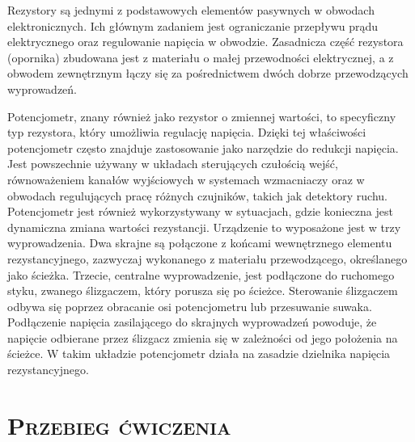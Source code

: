 \documentclass[,a4paper,12pt]{article}
\renewcommand{\cite}{\supercite}
\begin{document}
Rezystory są jednymi z podstawowych elementów pasywnych w obwodach elektronicznych. Ich głównym zadaniem jest ograniczanie przepływu prądu elektrycznego oraz regulowanie napięcia w obwodzie. Zasadnicza część rezystora (opornika) zbudowana jest z materiału o małej przewodności elektrycznej, a z obwodem zewnętrznym łączy się za pośrednictwem dwóch dobrze przewodzących wyprowadzeń\cite{platt2021}.\\ \par
Potencjometr, znany również jako rezystor o zmiennej wartości, to specyficzny typ rezystora, który umożliwia regulację napięcia. Dzięki tej właściwości potencjometr często znajduje zastosowanie jako narzędzie do redukcji napięcia. Jest powszechnie używany w układach sterujących czułością wejść, równoważeniem kanałów wyjściowych w systemach wzmacniaczy oraz w obwodach regulujących pracę różnych czujników, takich jak detektory ruchu. Potencjometr jest również wykorzystywany w sytuacjach, gdzie konieczna jest dynamiczna zmiana wartości rezystancji. Urządzenie to wyposażone jest w trzy wyprowadzenia. Dwa skrajne są połączone z końcami wewnętrznego elementu rezystancyjnego, zazwyczaj wykonanego z materiału przewodzącego, określanego jako ścieżka. Trzecie, centralne wyprowadzenie, jest podłączone do ruchomego styku, zwanego ślizgaczem, który porusza się po ścieżce. Sterowanie ślizgaczem odbywa się poprzez obracanie osi potencjometru lub przesuwanie suwaka. Podłączenie napięcia zasilającego do skrajnych wyprowadzeń powoduje, że napięcie odbierane przez ślizgacz zmienia się w zależności od jego położenia na ścieżce. W takim układzie potencjometr działa na zasadzie dzielnika napięcia rezystancyjnego\cite{platt2021}.
\section{\textsc{Przebieg ćwiczenia}}
\end{document}

